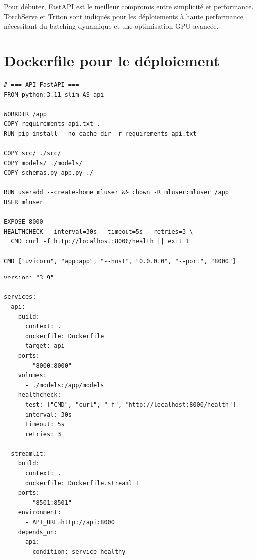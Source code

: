 \begin{remarque}
Pour d\'ebuter, FastAPI est le meilleur compromis entre simplicit\'e et
performance. TorchServe et Triton sont indiqu\'es pour les d\'eploiements
\`a haute performance n\'ecessitant du batching dynamique et une
optimisation GPU avanc\'ee.
\end{remarque}

\section{Dockerfile pour le d\'eploiement}
\label{sec:deploy-dockerfile}

\begin{codeblock}[title=\textbf{Dockerfile pour l'API + Streamlit}]
\begin{verbatim}
# === API FastAPI ===
FROM python:3.11-slim AS api

WORKDIR /app
COPY requirements-api.txt .
RUN pip install --no-cache-dir -r requirements-api.txt

COPY src/ ./src/
COPY models/ ./models/
COPY schemas.py app.py ./

RUN useradd --create-home mluser && chown -R mluser:mluser /app
USER mluser

EXPOSE 8000
HEALTHCHECK --interval=30s --timeout=5s --retries=3 \
  CMD curl -f http://localhost:8000/health || exit 1

CMD ["uvicorn", "app:app", "--host", "0.0.0.0", "--port", "8000"]
\end{verbatim}
\end{codeblock}

\begin{codeblock}[title=\textbf{docker-compose.yml pour API + Streamlit}]
\begin{verbatim}
version: "3.9"

services:
  api:
    build:
      context: .
      dockerfile: Dockerfile
      target: api
    ports:
      - "8000:8000"
    volumes:
      - ./models:/app/models
    healthcheck:
      test: ["CMD", "curl", "-f", "http://localhost:8000/health"]
      interval: 30s
      timeout: 5s
      retries: 3

  streamlit:
    build:
      context: .
      dockerfile: Dockerfile.streamlit
    ports:
      - "8501:8501"
    environment:
      - API_URL=http://api:8000
    depends_on:
      api:
        condition: service_healthy
\end{verbatim}
\end{codeblock}

